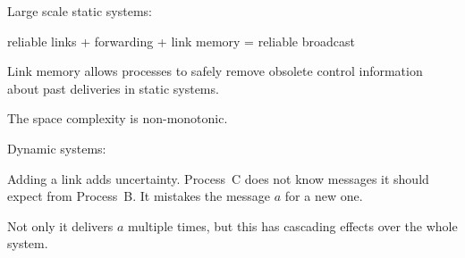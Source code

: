 \documentclass[10pt, xcolor={usenames, dvipsnames}]{beamer}
\newcommand{\cmark}{\ding{51}}
\newcommand{\xmark}{\ding{55}}
\newcommand{\YES}[1]{\textcolor{green}{#1}}
\newcommand{\NO}[1]{\textcolor{red}{#1}}
\begin{document}
\begin{frame}{Large scale static systems: \YES{\cmark}}
  
  reliable links + forwarding + link memory = reliable broadcast

  \begin{minipage}{0.24\textwidth}
    \centering
        
  \end{minipage}
  \begin{minipage}{0.24\textwidth}
    \vspace{11pt}
    \centering
        
  \end{minipage}
  \begin{minipage}{0.24\textwidth}
    \vspace{11pt}
    \centering
        
  \end{minipage}
  \begin{minipage}{0.24\textwidth}
    \vspace{1pt}
    \centering
    
  \end{minipage}

  \vspace{2em}

  Link memory allows processes to safely remove obsolete control information
  about past deliveries in static systems.
  
  The space complexity is non-monotonic.

\end{frame}

\begin{frame}{Dynamic systems: \NO{\xmark}}
  
  \begin{minipage}{0.24\textwidth}
    \centering
        
  \end{minipage}
  \begin{minipage}{0.24\textwidth}
    \centering
        
  \end{minipage}
  \begin{minipage}{0.24\textwidth}
    \centering
        
  \end{minipage}
  \begin{minipage}{0.24\textwidth}
    \centering
    
  \end{minipage}
  
  \vspace{2em}

  Adding a link adds uncertainty. Process~C does not know messages it should
  expect from Process~B. It mistakes the message $a$ for a new one.

  Not only it delivers $a$ multiple times, but this has cascading effects over
  the whole system.

\end{frame}
\end{document}
